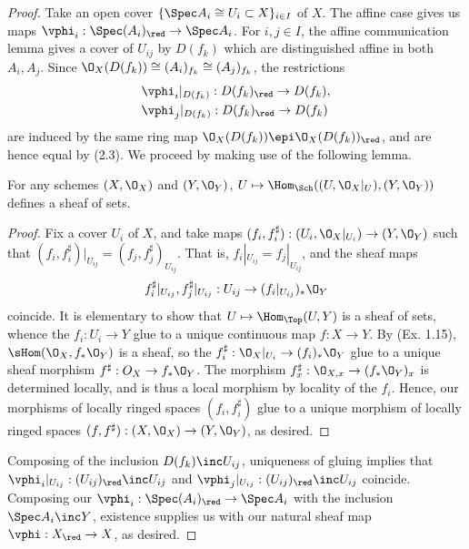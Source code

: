 \documentclass[12pt]{amsart}
\begin{document}
\begin{proof}
  Take an open cover $\{\Spec A_i\cong U_i\subset X\}_{i\in I}$ of $X$.
  The affine case gives us maps $\vphi_i:\Spec (A_i)_\red\to \Spec A_i$.
  For $i,j\in I$, the affine communication lemma gives a cover of $U_{ij}$ by $D(f_k)$ which are distinguished affine in both $A_i,A_j$.
  Since $\O_X(D(f_k))\cong (A_i)_{f_k}\cong (A_j)_{f_k}$, the restrictions 
  \begin{align*}
    &\vphi_i|_{D(f_k)}:D(f_k)_\red\to D(f_k), \\
    &\vphi_j|_{D(f_k)}:D(f_k)_\red\to D(f_k)
  \end{align*}
  are induced by the same ring map $\O_X(D(f_k))\epi \O_X(D(f_k))_\red$, and are hence equal by (2.3).
  We proceed by making use of the following lemma.

  \begin{lemma}
    For any schemes $(X,\O_X)$ and $(Y,\O_Y)$, $U\mapsto \Hom_{\Sch}((U,\O_X|_U),(Y,\O_Y))$ defines a sheaf of sets.
  \end{lemma}

  \begin{proof}
    Fix a cover $U_i$ of $X$, and take maps $(f_i,f_i^\sharp):(U_i,\O_X|_{U_i})\to (Y,\O_Y)$ such that $(f_i,f_i^\sharp)|_{U_{ij}}=(f_j,f_j^\sharp)_{U_{ij}}$.
    That is, $f_i|_{U_{ij}}=f_j|_{U_{ij}}$, and the sheaf maps 
    \[
      f_i^\sharp|_{U_{ij}},f_j^\sharp|_{U_{ij}}:U_{ij}\to (f_i|_{U_{ij}})_*\O_Y%
    \]
    coincide.
    It is elementary to show that $U\mapsto \Hom_{\Top}(U,Y)$ is a sheaf of sets, whence the $f_i:U_i\to Y$ glue to a unique continuous map $f:X\to Y$.
  By (Ex. 1.15), $\sHom(\O_X,f_*\O_Y)$ is a sheaf, so the $f_i^\sharp:\O_X|_{U_i}\to (f_i)_*\O_Y$ glue to a unique sheaf morphism $f^\sharp:O_X\to f_*\O_Y$.
  The morphism $f^\sharp_x:\O_{X,x}\to (f_*\O_Y)_x$ is determined locally, and is thus a local morphism by locality of the $f_i$.
  Hence, our morphisms of locally ringed spaces $(f_i,f_i^\sharp)$ glue to a unique morphism of locally ringed spaces $(f,f^\sharp):(X,\O_X)\to (Y,\O_Y)$, as desired.
  \end{proof}

  Composing of the inclusion $D(f_k)\inc U_{ij}$, uniqueness of gluing implies that $\vphi_i|_{U_{ij}}:(U_{ij})_\red\inc U_{ij}$ and $\vphi_j|_{U_{ij}}:(U_{ij})_\red\inc U_{ij}$ coincide.
  Composing our $\vphi_i:\Spec (A_i)_\red\to \Spec A_i$ with the inclusion $\Spec A_i\inc Y$, existence supplies us with our natural sheaf map $\vphi:X_\red\to X$, as desired.


\end{proof}
\end{document}
